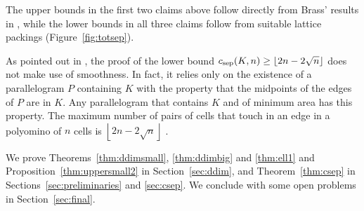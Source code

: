\documentclass[a4paper,12pt]{article}
\theoremstyle{plain}
\theoremstyle{definition}
\newcommand{\csep}{c_{\textnormal{sep}}} %
\newcommand{\floor}[1]{\left\lfloor#1\right\rfloor}
\begin{document}
The upper bounds in the first two claims above follow directly from Brass' results in \cite{Br96}, while the lower bounds in all three claims follow from suitable lattice packings (Figure~\ref{fig:totsep}).

As pointed out in \cite[Remark~14]{BKO}, the proof of 
the lower bound $\csep(K,n)\geq\floor{2n-2\sqrt{n}}$ does not make use of 
smoothness. In fact, it relies only on the existence of a parallelogram $P$ 
containing $K$ with the property that the midpoints of the edges of $P$ are in 
$K$.
Any parallelogram that contains $K$ and of minimum area has this property.
The maximum number of pairs of cells that touch in an edge in a polyomino of $n$ cells is $\floor{2n-2\sqrt{n}}$ \cite{BKO}.

We prove Theorems~\ref{thm:ddimsmall}, \ref{thm:ddimbig} and \ref{thm:ell1} and Proposition~\ref{thm:uppersmall2} in 
Section~\ref{sec:ddim}, and Theorem~\ref{thm:csep} in Sections~\ref{sec:preliminaries} and \ref{sec:csep}. We conclude with some open problems in Section~\ref{sec:final}.
\end{document}
